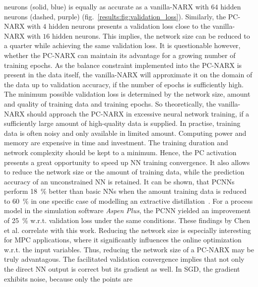neurons (solid, blue) is equally as accurate as a vanilla-NARX with $64$ hidden neurons (dashed, purple) (fig.~\ref{results:fig:validation_loss}).
Similarly, the PC-NARX with $4$ hidden neurons presents a validation loss close to the vanilla-NARX with
$16$ hidden neurons. This implies, the network size can be reduced to a quarter while achieving
the same validation loss.
\newline
\newline
It is questionable however, whether the PC-NARX can maintain its advantage for a growing number of training epochs.
As the balance constraint implemented into the PC-NARX is present in the data itself, the vanilla-NARX
will approximate it on the domain of the data up to validation accuracy,
if the number of epochs is sufficiently high.
The minimum possible 
validation loss is determined by the network size, amount and quality of training data and training epochs.
So theoretically, the vanilla-NARX should approach the PC-NARX in excessive neural network training,
if a sufficiently large amount of high-quality data is supplied.
\newline
\newline
In practise, training data is often noisy and only available in limited amount.
Computing power and memory are expensive in time and investment. The training duration
and network complexity should be kept to a minimum. Hence, the PC activation
presents a great opportunity to speed up NN training convergence. It also
allows to reduce the network size or the amount of training data,
while the prediction accuracy of an unconstrained NN is retained. It can be shown, that
PCNNs perform \SI{18}{\%} better than basic NNs when the amount training
data is reduced to \SI{60}{\%} in one specific case of modelling an extractive distillation~\cite{chen2024}.
For a process model in the simulation software \emph{Aspen Plus}, the PCNN yielded an improvement of \SI{25}{\%} w.r.t. validation loss 
under the same conditions. These findings by Chen et al. \cite{chen2024} correlate with this work.
Reducing the network size is especially interesting for MPC applications, where it
significantly influences the online optimization w.r.t. the input variables.
Thus, reducing the network size of a PC-NARX may be truly advantagous.
\newline
\newline
\noindent
The facilitated validation convergence implies that not only the direct NN output is correct
but its gradient as well. In SGD, the gradient exhibits noise, because only the points are
